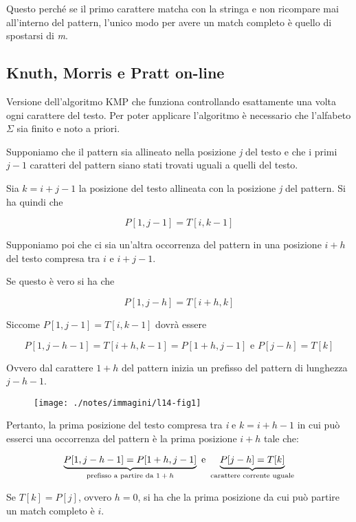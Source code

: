 Questo perché se il primo carattere matcha con la stringa e non
ricompare mai all'interno del pattern, l'unico modo per avere un match
completo è quello di spostarsi di \emph{m}.

\subsection{Knuth, Morris e Pratt on-line}\label{knuth-morris-e-pratt-on-line}

Versione dell'algoritmo \textsc{KMP} che funziona controllando esattamente una volta ogni carattere del testo. Per poter applicare l'algoritmo è necessario che l'alfabeto $ \Sigma $ sia finito e noto a
priori.

Supponiamo che il pattern sia allineato nella posizione \textit{j} del testo e che i primi $j-1$ caratteri del pattern siano stati trovati uguali a quelli del testo.

Sia $ k =i+j-1 $ la posizione del testo allineata con la posizione \textit{j} del pattern. Si ha quindi che 

$$
P[1, j-1] = T[i, k-1]
$$

Supponiamo poi che ci sia un'altra occorrenza del pattern in una posizione $ i+h $ del testo compresa tra $ i$ e $ i+j-1 $.

Se questo è vero si ha che 

$$
P[1, j-h] = T[i+h,k]
$$

Siccome $ P[1,j-1] = T[i , k-1] $ dovrà essere

$$
P[1, j-h-1] = T[i+h, k-1] = P[1+h, j-1] \text{ e } P[j-h] = T[k]
$$

Ovvero dal carattere $ 1+h $ del pattern inizia un prefisso del pattern di lunghezza $ j -h -1 $.

\begin{figure}[htbp]
	\centering
	\texttt{[image: ./notes/immagini/l14-fig1]}
\end{figure}

Pertanto, la prima posizione del testo compresa tra \textit{i} e $ k = i + h -1 $  in cui può esserci una occorrenza del pattern è la prima posizione $ i+h $ tale che:

$$
\underbrace{P[1, j -h -1] = P[1+h, j -1]}_{\text{prefisso a partire da $ 1+h $}} \text{ e } \underbrace{P[j-h] = T[k]}_{\text{carattere corrente uguale}}
$$

Se $ T[k] = P[j] $, ovvero $ h=0 $, si ha che la prima posizione da cui può partire un match completo è $ i $.

